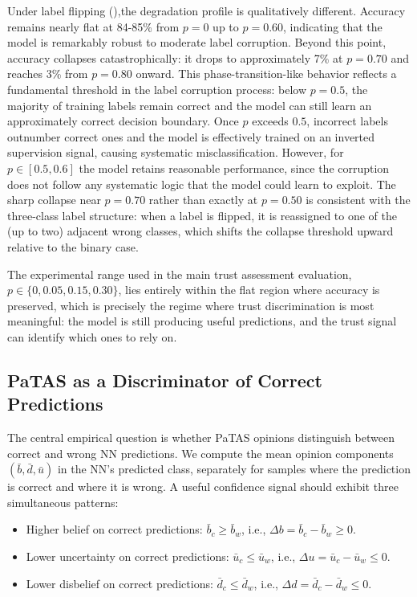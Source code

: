 Under label flipping (),the degradation profile is qualitatively different. Accuracy remains nearly flat at 84-85\% from $p = 0$ up to $p = 0.60$, indicating that the model is remarkably robust to moderate label corruption. Beyond this point, accuracy collapses catastrophically: it drops to approximately 7\% at $p = 0.70$ and reaches 3\% from $p = 0.80$ onward.  This phase-transition-like behavior reflects a fundamental threshold in the label corruption process: below $p = 0.5$, the majority of training labels remain correct and the model can still learn an approximately correct decision boundary. Once $p$ exceeds $0.5$, incorrect labels outnumber correct ones and the model is effectively trained on an inverted supervision signal, causing systematic misclassification. However, for $p \in [0.5, 0.6]$ the model retains reasonable performance, since the corruption does not follow any systematic logic that the model could learn to exploit. The sharp collapse near $p = 0.70$ rather than exactly at $p = 0.50$ is consistent with the three-class label structure: when a label is flipped, it is reassigned to one of the (up to two) adjacent wrong classes, which shifts the collapse threshold upward relative to the binary case. 

The experimental range used in the main trust assessment evaluation, $p \in \{0, 0.05, 0.15, 0.30\}$, lies entirely within the flat region where accuracy is preserved, which is precisely the regime where trust discrimination is most meaningful: the model is still producing useful predictions, and the trust signal can identify which ones to rely on.

\subsection{\ac{PaTAS} as a Discriminator of Correct Predictions}
\label{sec:patas_discriminator}

The central empirical question is whether \ac{PaTAS} opinions distinguish between correct and wrong \ac{NN} predictions. We compute the mean opinion components $(\bar{b}, \bar{d}, \bar{u})$ in the \ac{NN}'s predicted class, separately for samples where the prediction is correct and where it is wrong. A useful confidence signal should exhibit three simultaneous patterns:

\begin{itemize}
    \item Higher belief on correct predictions: $\bar{b}_c \ge \bar{b}_w$, i.e., $\Delta b =\bar{b}_c - \bar{b}_w  \ge 0$.
    \item Lower uncertainty on correct predictions: $\bar{u}_c \le \bar{u}_w$, i.e., $\Delta u =\bar{u}_c - \bar{u}_w  \le 0$.
    \item Lower disbelief on correct predictions: $\bar{d}_c \le \bar{d}_w$, i.e., $\Delta d =\bar{d}_c - \bar{d}_w  \le 0$.
\end{itemize}

